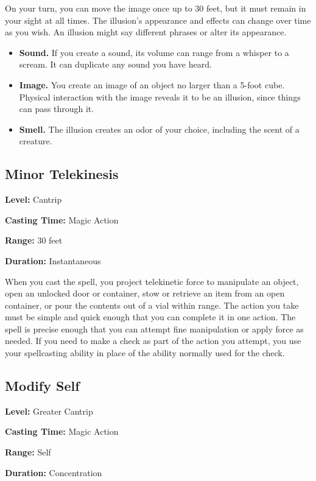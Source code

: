 \documentclass[12pt,letterpaper,twocolumn,openany,nodeprecatedcode,bg=none]{dndbook}
\providecommand{\tightlist}{%
  \setlength{\itemsep}{0pt}\setlength{\parskip}{0pt}}
\begin{document}
On your turn, you can move the image once up to 30 feet, but it must
remain in your sight at all times. The illusion's appearance and effects
can change over time as you wish. An illusion might say different
phrases or alter its appearance.

\begin{itemize}
\tightlist
\item
  \textbf{Sound.} If you create a sound, its volume can range from a
  whisper to a scream. It can duplicate any sound you have heard.
\item
  \textbf{Image.} You create an image of an object no larger than a
  5-foot cube. Physical interaction with the image reveals it to be an
  illusion, since things can pass through it.
\item
  \textbf{Smell.} The illusion creates an odor of your choice, including
  the scent of a creature.
\end{itemize}

\subsection{Minor Telekinesis}\label{minor-telekinesis}

\textbf{Level:} Cantrip

\textbf{Casting Time:} Magic Action

\textbf{Range:} 30 feet

\textbf{Duration:} Instantaneous

When you cast the spell, you project telekinetic force to manipulate an
object, open an unlocked door or container, stow or retrieve an item
from an open container, or pour the contents out of a vial within range.
The action you take must be simple and quick enough that you can
complete it in one action. The spell is precise enough that you can
attempt fine manipulation or apply force as needed. If you need to make
a check as part of the action you attempt, you use your spellcasting
ability in place of the ability normally used for the check.

\subsection{Modify Self}\label{modify-self}

\textbf{Level:} Greater Cantrip

\textbf{Casting Time:} Magic Action

\textbf{Range:} Self

\textbf{Duration:} Concentration
\end{document}
